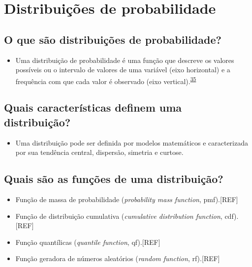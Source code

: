 \documentclass[
  a4paper,
]{book}
\providecommand{\tightlist}{%
  \setlength{\itemsep}{0pt}\setlength{\parskip}{0pt}}
\begin{document}
\hypertarget{distribuicoes}{%
\section{Distribuições de probabilidade}\label{distribuicoes}}

\hypertarget{o-que-suxe3o-distribuiuxe7uxf5es-de-probabilidade}{%
\subsection{O que são distribuições de probabilidade?}\label{o-que-suxe3o-distribuiuxe7uxf5es-de-probabilidade}}

\begin{itemize}
\tightlist
\item
  Uma distribuição de probabilidade é uma função que descreve os valores possíveis ou o intervalo de valores de uma variável (eixo horizontal) e a frequência com que cada valor é observado (eixo vertical).\textsuperscript{\protect\hyperlink{ref-vetter2017}{35}}
\end{itemize}

\hypertarget{quais-caracteruxedsticas-definem-uma-distribuiuxe7uxe3o}{%
\subsection{Quais características definem uma distribuição?}\label{quais-caracteruxedsticas-definem-uma-distribuiuxe7uxe3o}}

\begin{itemize}
\tightlist
\item
  Uma distribuição pode ser definida por modelos matemáticos e caracterizada por sua tendência central, dispersão, simetria e curtose.
\end{itemize}

\hypertarget{quais-suxe3o-as-funuxe7uxf5es-de-uma-distribuiuxe7uxe3o}{%
\subsection{Quais são as funções de uma distribuição?}\label{quais-suxe3o-as-funuxe7uxf5es-de-uma-distribuiuxe7uxe3o}}

\begin{itemize}
\item
  Função de massa de probabilidade (\emph{probability mass function}, pmf).{[}REF{]}
\item
  Função de distribuição cumulativa (\emph{cumulative distribution function}, cdf).{[}REF{]}
\item
  Função quantílicas (\emph{quantile function}, qf).{[}REF{]}
\item
  Função geradora de números aleatórios (\emph{random function}, rf).{[}REF{]}
\end{itemize}
\end{document}
